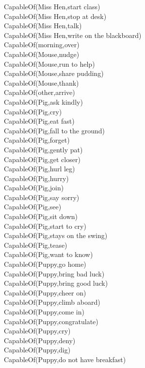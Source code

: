\begin{multicols}{2}
\begin{footnotesize}
CapableOf(Miss Hen,start class) \\
CapableOf(Miss Hen,stop at desk) \\
CapableOf(Miss Hen,talk) \\
CapableOf(Miss Hen,write on the blackboard) \\
CapableOf(morning,over) \\
CapableOf(Mouse,nudge) \\
CapableOf(Mouse,run to help) \\
CapableOf(Mouse,share pudding) \\
CapableOf(Mouse,thank) \\
CapableOf(other,arrive) \\
CapableOf(Pig,ask kindly) \\
CapableOf(Pig,cry) \\
CapableOf(Pig,eat fast) \\
CapableOf(Pig,fall to the ground) \\
CapableOf(Pig,forget) \\
CapableOf(Pig,gently pat) \\
CapableOf(Pig,get closer) \\
CapableOf(Pig,hurl leg) \\
CapableOf(Pig,hurry) \\
CapableOf(Pig,join) \\
CapableOf(Pig,say sorry) \\
CapableOf(Pig,see) \\
CapableOf(Pig,sit down) \\
CapableOf(Pig,start to cry) \\
CapableOf(Pig,stays on the swing) \\
CapableOf(Pig,tease) \\
CapableOf(Pig,want to know) \\
CapableOf(Puppy,go home) \\
CapableOf(Puppy,bring bad luck) \\
CapableOf(Puppy,bring good luck) \\
CapableOf(Puppy,cheer on) \\
CapableOf(Puppy,climb aboard) \\
CapableOf(Puppy,come in) \\
CapableOf(Puppy,congratulate) \\
CapableOf(Puppy,cry) \\
CapableOf(Puppy,deny) \\
CapableOf(Puppy,dig) \\
CapableOf(Puppy,do not have breakfast) \\

\end{footnotesize}
\end{multicols}
